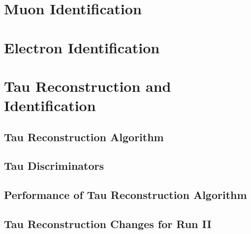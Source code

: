 \section{Muon Identification}
\label{sec:Muon}


\section{Electron Identification}
\label{sec:Electron}



\section{Tau Reconstruction and Identification}
\label{sec:Tau}

\subsection{Tau Reconstruction Algorithm}
\label{subsec:HPS}

\subsection{Tau Discriminators}
\label{subsec:Discriminators}

\subsection{Performance of Tau Reconstruction Algorithm}
\label{subsec:Performance}

\subsection{Tau Reconstruction Changes for Run II}
\label{subsec:Changes}





